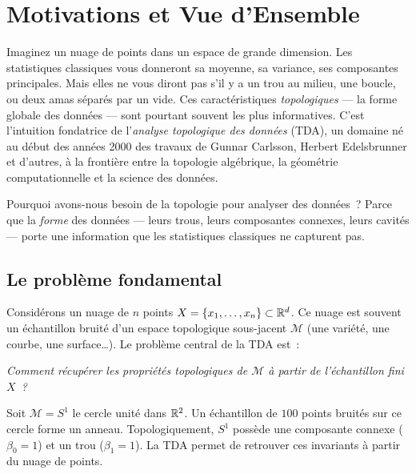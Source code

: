 \chapter{Motivations et Vue d'Ensemble}
\label{ch:motivations}

Imaginez un nuage de points dans un espace de grande dimension. Les
statistiques classiques vous donneront sa moyenne, sa variance, ses
composantes principales. Mais elles ne vous diront pas s'il y a un
\og trou\fg{} au milieu, une boucle, ou deux amas s\'epar\'es par un vide.
Ces caract\'eristiques \emph{topologiques} --- la forme globale des donn\'ees
--- sont pourtant souvent les plus informatives. C'est l'intuition
fondatrice de l'\emph{analyse topologique des donn\'ees} (TDA), un domaine
n\'e au d\'ebut des ann\'ees 2000 des travaux de Gunnar Carlsson, Herbert
Edelsbrunner et d'autres, \`a la fronti\`ere entre la topologie alg\'ebrique,
la g\'eom\'etrie computationnelle et la science des donn\'ees.

\begin{intuition}
Pourquoi avons-nous besoin de la topologie pour analyser des donn\'ees~?
Parce que la \emph{forme} des donn\'ees --- leurs trous, leurs composantes
connexes, leurs cavit\'es --- porte une information que les statistiques
classiques ne capturent pas.
\end{intuition}

\section{Le probl\`eme fondamental}

Consid\'erons un nuage de $n$ points $X = \{x_1, \ldots, x_n\} \subset \mathbb{R}^d$.
Ce nuage est souvent un \'echantillon bruit\'e d'un espace topologique
sous-jacent $\mathcal{M}$ (une vari\'et\'e, une courbe, une surface\ldots).
Le probl\`eme central de la TDA est~:

\begin{formules}[title=\textbf{Question fondamentale}]
\emph{Comment r\'ecup\'erer les propri\'et\'es topologiques de $\mathcal{M}$
\`a partir de l'\'echantillon fini $X$~?}
\end{formules}

\begin{exemple}
Soit $\mathcal{M} = S^1$ le cercle unit\'e dans $\mathbb{R}^2$. Un \'echantillon
de $100$ points bruit\'es sur ce cercle forme un anneau. Topologiquement,
$S^1$ poss\`ede une composante connexe ($\beta_0 = 1$) et un trou
($\beta_1 = 1$). La TDA permet de retrouver ces invariants \`a partir
du nuage de points.
\end{exemple}

